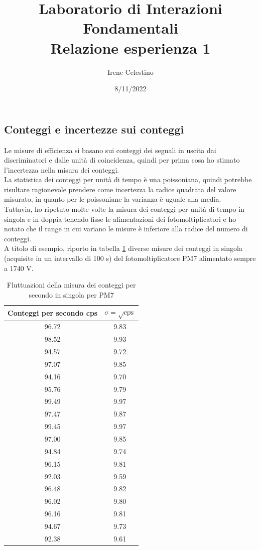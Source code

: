 \documentclass{article}
\title{Laboratorio di Interazioni Fondamentali \\ Relazione esperienza 1}
\author{Irene Celestino}
\date{8/11/2022}
\begin{document}
\maketitle

\subsection{Conteggi e incertezze sui conteggi}
Le misure di efficienza si basano sui conteggi dei segnali in uscita dai discriminatori e dalle unità di coincidenza, quindi per prima cosa ho stimato l'incertezza nella misura dei conteggi. 
\\
La statistica dei conteggi per unità di tempo è una poissoniana, quindi potrebbe risultare ragionevole prendere come incertezza la radice quadrata del valore misurato, in quanto per le poissoniane la varianza è uguale alla media. 
\\
Tuttavia, ho ripetuto molte volte la misura dei conteggi per unità di tempo in singola e in doppia tenendo fisse le alimentazioni dei fotomoltiplicatori e ho notato che il range in cui variano le misure è inferiore alla radice del numero di conteggi. \\
A titolo di esempio, riporto in tabella \ref{errcont} diverse misure dei conteggi in singola (acquisite in un intervallo di 100 s) del fotomoltiplicatore PM7 alimentato sempre a 1740 V. 

\begin{table}[h!]
\centering
\begin{tabular}{|c|c|}
\hline
Conteggi per secondo cps & $\sigma =\sqrt{\text{cps}}$ \\ 
 \hline
\hline 
96.72 &  9.83 \\ 
\hline 
98.52 &  9.93 \\ 
\hline 
94.57 &  9.72 \\ 
\hline 
97.07 &  9.85 \\ 
\hline 
94.16 &  9.70 \\ 
\hline 
95.76 &  9.79 \\ 
\hline 
99.49 &  9.97 \\ 
\hline 
97.47 &  9.87 \\ 
\hline 
99.45 &  9.97 \\ 
\hline 
97.00 &  9.85 \\ 
\hline 
94.84 &  9.74 \\ 
\hline 
96.15 &  9.81 \\ 
\hline 
92.03 &  9.59 \\ 
\hline 
96.48 &  9.82 \\ 
\hline 
96.02 &  9.80 \\ 
\hline 
96.16 &  9.81 \\ 
\hline 
94.67 &  9.73 \\ 
\hline 
92.38 &  9.61 \\ 
\hline 
\end{tabular}
\caption{Fluttuazioni della misura dei conteggi per secondo in singola per PM7}\label{errcont}
\end{table}
\end{document}
